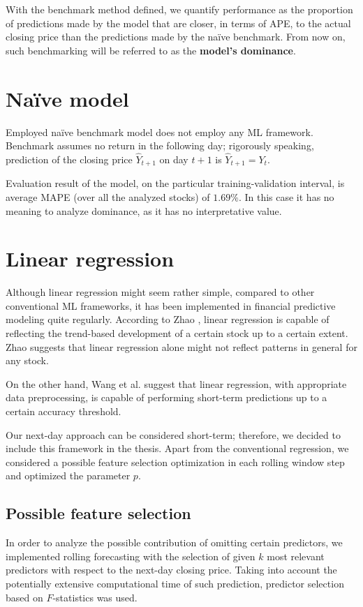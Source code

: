 With the benchmark method defined, we quantify performance as the proportion of predictions made by the model that are closer, in terms of APE, to the actual 
closing price than the predictions made by the naïve benchmark. From now on, such benchmarking will be referred to as the \textbf{model's dominance}.

\section{Naïve model}
\label{naive}
Employed naïve benchmark model does not employ any ML framework. Benchmark assumes no return in the following day; rigorously speaking, prediction of the closing price $\hat{Y}_{t+1}$ on day $t + 1$ is $\hat{Y}_{t+1} = Y_{t}$.

Evaluation result of the model, on the particular training-validation interval, is average MAPE (over all the analyzed stocks) of $\mathbf{1.69 \%}$. In this case it has no meaning to analyze dominance, as it has no interpretative value.

\section{Linear regression}
Although linear regression might seem rather simple, compared to other conventional ML frameworks, it has been implemented in financial predictive
modeling quite regularly. According to Zhao \cite{zhao}, linear regression is capable of reflecting the trend-based development of a certain stock up to a certain extent. 
Zhao suggests that linear regression alone might not reflect patterns in general for any stock.

On the other hand, Wang et al. \cite{wang} suggest that linear regression, with appropriate data preprocessing, is capable of performing short-term predictions up to a certain
accuracy threshold.

Our next-day approach can be considered short-term; therefore, we decided to include this framework in the thesis. Apart from the conventional regression, we considered 
a possible feature selection optimization in each rolling window step and optimized the parameter $p$.

\subsection{Possible feature selection}
In order to analyze the possible contribution of omitting certain predictors, we implemented rolling forecasting with the selection of given $k$ most relevant predictors
with respect to the next-day closing price. Taking into account the potentially extensive computational time of such prediction, predictor selection based on $F$-statistics
was used. 

